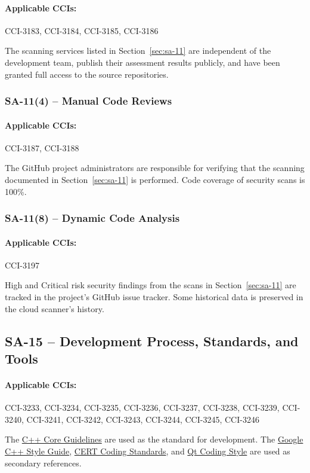 \documentclass[letterpaper, 10pt, twoside]{article}
\begin{document}
\paragraph{Applicable CCIs:} CCI-3183, CCI-3184, CCI-3185, CCI-3186

The scanning services listed in Section~\ref{sec:sa-11} are independent of the development team, publish their assessment results publicly, and have been granted full access to the source repositories.

\subsubsection{SA-11(4) -- Manual Code Reviews}

\paragraph{Applicable CCIs:} CCI-3187, CCI-3188

The GitHub project administrators are responsible for verifying that the scanning documented in Section~\ref{sec:sa-11} is performed. Code coverage of security scans is 100\%.

\subsubsection{SA-11(8) -- Dynamic Code Analysis}

\paragraph{Applicable CCIs:} CCI-3197

High and Critical risk security findings from the scans in Section~\ref{sec:sa-11} are tracked in the project's GitHub issue tracker. Some historical data is preserved in the cloud scanner's history.

\subsection{SA-15 -- Development Process, Standards, and Tools}

\paragraph{Applicable CCIs:} CCI-3233, CCI-3234, CCI-3235, CCI-3236, CCI-3237, CCI-3238, CCI-3239, CCI-3240, CCI-3241, CCI-3242, CCI-3243, CCI-3244, CCI-3245, CCI-3246

The \href{http://isocpp.github.io/CppCoreGuidelines/CppCoreGuidelines#S-functions}{C++ Core Guidelines} are used as the standard for development. The \href{https://google.github.io/styleguide/cppguide.html}{Google C++ Style Guide}, \href{https://resources.sei.cmu.edu/downloads/secure-coding/assets/sei-cert-cpp-coding-standard-2016-v01.pdf}{CERT Coding Standards}, and \href{https://wiki.qt.io/Qt_Coding_Style}{Qt Coding Style} are used as secondary references.
\end{document}
